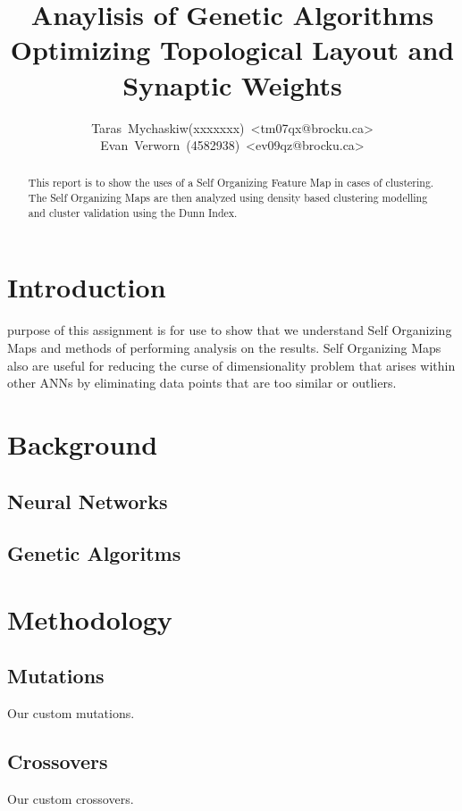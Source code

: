 \documentclass[journal]{IEEEtran}
\begin{document}
\title{Anaylisis of Genetic Algorithms Optimizing Topological Layout and Synaptic Weights }

\author{Taras~Mychaskiw(xxxxxxx)~\textless{}tm07qx@brocku.ca\textgreater\\%
Evan~Verworn~(4582938)~\textless{}ev09qz@brocku.ca\textgreater%
}

\maketitle

\begin{abstract}
This report is to show the uses of a Self Organizing Feature Map in cases of clustering. The Self Organizing Maps are then analyzed using density based clustering
modelling and cluster validation using the Dunn Index.
\end{abstract}

\IEEEpeerreviewmaketitle

\section{Introduction}
 purpose of this assignment is for use to show that we understand
Self Organizing Maps and methods of performing analysis on the results. Self Organizing Maps also are useful for reducing the curse of dimensionality problem
that arises within other ANNs by eliminating data points that are too similar or 
outliers. 

\section{Background}
  \subsection{Neural Networks}
  \subsection{Genetic Algoritms}

\section{Methodology}
  \subsection{Mutations}
    Our custom mutations.
  \subsection{Crossovers}
    Our custom crossovers.
\end{document}
